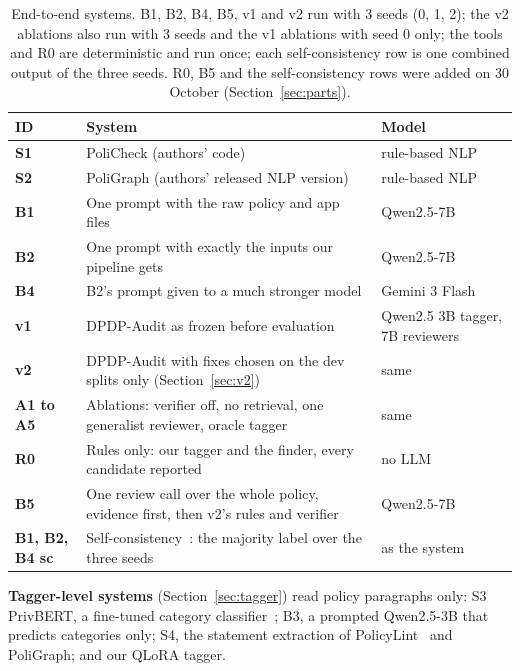 \documentclass[11pt,a4paper]{article}
\newcommand{\rowline}{\specialrule{0.2pt}{3pt}{3pt}}
\begin{document}
\begin{table}[H]
\centering
\small
\begin{tabular}{lL{7.6cm}l}
\toprule
ID & System & Model \\
\midrule
\textbf{S1} & PoliCheck (authors' code)~\cite{policheck} & rule-based NLP \\ \rowline
\textbf{S2} & PoliGraph (authors' released NLP version)~\cite{poligraph} & rule-based NLP \\ \rowline
\textbf{B1} & One prompt with the raw policy and app files & Qwen2.5-7B \\ \rowline
\textbf{B2} & One prompt with exactly the inputs our pipeline gets & Qwen2.5-7B \\ \rowline
\textbf{B4} & B2's prompt given to a much stronger model & Gemini 3 Flash \\ \rowline
\textbf{v1} & DPDP-Audit as frozen before evaluation & Qwen2.5 3B tagger, 7B reviewers \\ \rowline
\textbf{v2} & DPDP-Audit with fixes chosen on the dev splits only (Section~\ref{sec:v2}) &
same \\ \rowline
\textbf{A1 to A5} & Ablations: verifier off, no retrieval, one generalist reviewer, oracle
tagger & same \\ \rowline
\textbf{R0} & Rules only: our tagger and the finder, every candidate reported & no LLM \\ \rowline
\textbf{B5} & One review call over the whole policy, evidence first, then v2's rules and
verifier & Qwen2.5-7B \\ \rowline
\textbf{B1, B2, B4 sc} & Self-consistency~\cite{selfconsistency}: the majority label over the
three seeds & as the system \\
\bottomrule
\end{tabular}
\caption{End-to-end systems. B1, B2, B4, B5, v1 and v2 run with 3 seeds (0, 1, 2); the v2
ablations also run with 3 seeds and the v1 ablations with seed 0 only; the tools and R0 are
deterministic and run once; each self-consistency row is one combined output of the three seeds.
R0, B5 and the self-consistency rows were added on 30 October (Section~\ref{sec:parts}).}
\end{table}

\textbf{Tagger-level systems} (Section~\ref{sec:tagger}) read policy paragraphs only: S3 PrivBERT, a
fine-tuned category classifier~\cite{privaseer}; B3, a prompted Qwen2.5-3B that predicts categories
only; S4, the statement extraction of PolicyLint~\cite{policylint} and PoliGraph; and our QLoRA
tagger.
\end{document}
